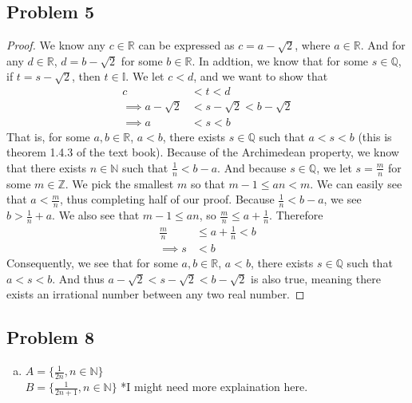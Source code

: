 \documentclass[12pt]{article}
\begin{document}
\subsection*{Problem 5}
\begin{proof}
    We know any $c \in \mathbb{R}$ can be expressed as $c = a - \sqrt{2}$, where $a \in \mathbb{R}$. 
    And for any $d \in \mathbb{R}$, $d = b - \sqrt{2}$ for some $b \in \mathbb{R}$. 
    In addtion, we know that for some $s \in \mathbb{Q}$, if $t = s - \sqrt{2}$, then $t \in \mathbb{I}$. 
    We let $ c < d$, and we want to show that
    \begin{align*}
        c &< t < d\\
        \implies a - \sqrt{2} &< s - \sqrt{2} < b - \sqrt{2}\\
        \implies a &< s < b 
    \end{align*}
    That is, for some $a,b \in \mathbb{R}$, $a < b$, there exists $s \in \mathbb{Q}$ such that $a < s < b$ (this is theorem 1.4.3 of the text book). 
    Because of the Archimedean property, we know that there exists $n \in \mathbb{N}$ such that $\frac{1}{n} < b - a$. 
    And because $s \in \mathbb{Q}$, we let $s = \frac{m}{n}$ for some $m \in \mathbb{Z}$. 
    We pick the smallest $m$ so that $m-1 \le an < m$.
    We can easily see that $a < \frac{m}{n}$, thus completing half of our proof. 
    Because $\frac{1}{n} < b - a$, we see $b > \frac{1}{n} + a$. We also see that $m - 1 \le an$, so $\frac{m}{n} \le a + \frac{1}{n}$. 
    Therefore
    \begin{align*}
        \frac{m}{n} &\le a + \frac{1}{n} < b\\
        \implies s &< b
    \end{align*}
    Consequently, we see that for some $a,b \in \mathbb{R}$, $a < b$, there exists $s \in \mathbb{Q}$ such that $a < s < b$. 
    And thus $a - \sqrt{2} < s - \sqrt{2} < b - \sqrt{2}$ is also true, meaning there exists an irrational number between any two real number. 
    
\end{proof}

\subsection*{Problem 8}
\begin{enumerate}[a).]
    \item {
    $A = \{ \frac{1}{2n}, n \in \mathbb{N}\}$\\
    $B = \{ \frac{1}{2n+1}, n \in \mathbb{N}\}$
    *I might need more explaination here.
    }
\end{enumerate}
\end{document}
